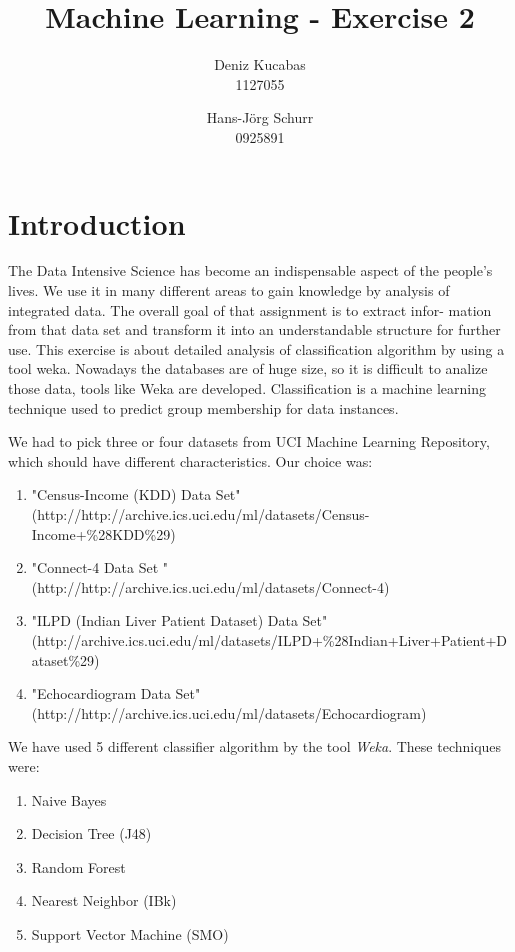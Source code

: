 \documentclass[a4paper]{article}
\begin{document}
\title{Machine Learning - Exercise 2 }
\author{
        Deniz Kucabas \\ 
                     1127055 
                    \and
                    Hans-Jörg Schurr \\ 0925891
}

\maketitle
\tableofcontents
\newpage

\section{Introduction}
The Data Intensive Science has become an indispensable aspect of the people's
lives. We use it in many different areas to gain knowledge by analysis
of integrated data. The overall goal of that assignment is to extract infor-
mation from that data set and transform it into an understandable structure
for further use. This exercise is about detailed analysis of classification
algorithm by using a tool weka.  Nowadays the databases are of huge size, so it
is difficult to analize those data, tools like Weka are 
developed. Classification is a machine learning technique used 
to predict group membership for data instances. 

We had to pick three or four datasets from UCI Machine Learning Repository, which
should have different characteristics.  Our choice was:
\begin{enumerate}
    \item "Census-Income (KDD) Data Set" \\ 
(http://http://archive.ics.uci.edu/ml/datasets/Census-Income+\%28KDD\%29)
    \item "Connect-4 Data Set " \\
        (http://http://archive.ics.uci.edu/ml/datasets/Connect-4)
    \item "ILPD (Indian Liver Patient Dataset) Data Set"\\
        (http://archive.ics.uci.edu/ml/datasets/ILPD+\%28Indian+Liver+Patient+Dataset\%29)
    \item "Echocardiogram  Data Set" \\
        (http://http://archive.ics.uci.edu/ml/datasets/Echocardiogram)
\end{enumerate}

We have used 5 different classifier algorithm by the tool \emph{Weka}. 
These techniques were:
\begin{enumerate}
    \item Naive Bayes
    \item Decision Tree (J48)
    \item Random Forest
    \item Nearest Neighbor (IBk)
    \item Support Vector Machine (SMO)
\end{enumerate}
\end{document}

